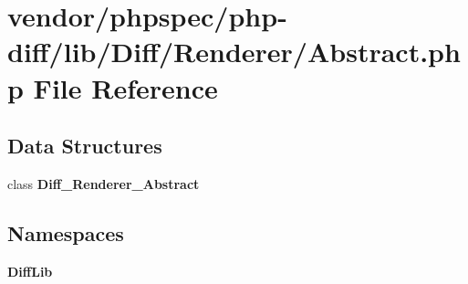 \section{vendor/phpspec/php-\/diff/lib/\+Diff/\+Renderer/\+Abstract.php File Reference}
\label{_abstract_8php}
\subsection*{Data Structures}
\begin{DoxyCompactItemize}
\item 
class {\bf Diff\+\_\+\+Renderer\+\_\+\+Abstract}
\end{DoxyCompactItemize}
\subsection*{Namespaces}
\begin{DoxyCompactItemize}
\item 
 {\bf Diff\+Lib}
\end{DoxyCompactItemize}
